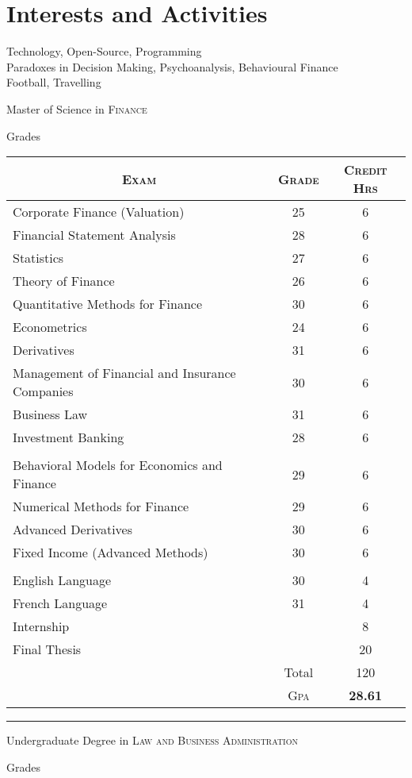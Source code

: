 \documentclass[a4paper,10pt]{article}
\begin{document}
	\section{Interests and Activities}
	Technology, Open-Source, Programming\\
	Paradoxes in Decision Making, Psychoanalysis, Behavioural Finance\\
	Football, Travelling
	
	\newpage
	\par{\centering\Large \hypertarget{grds}{Master of Science in \textsc{Finance}}\par}\large{\centering Grades\par}\normalsize
	\begin{center}
		\begin{tabular}{lcc}
			\multicolumn{1}{c}{\textsc{Exam}}&\textsc{Grade}&\textsc{Credit Hrs}\\ \hline
			Corporate Finance (Valuation)	&25&	6\\
			Financial Statement Analysis	&28&	6\\
			Statistics	&27&	6\\
			Theory of Finance	&26&	6\\
			Quantitative Methods for Finance	&30&	6\\
			Econometrics	&24	&6\\
			Derivatives	&31&	6\\
			Management of Financial and Insurance Companies	&30&	6\\
			Business Law	&31&	6\\
			Investment Banking	&28&	6\\ \\
			
			Behavioral Models for Economics and Finance	&29&	6\\
			Numerical Methods for Finance	&29&	6\\
			Advanced Derivatives	&30&	6\\
			Fixed Income (Advanced Methods)	&30&	6\\ \\
			
			English Language	&30&	4\\
			French Language	&31&	4\\
			
			Internship	&	&8\\
			
			Final Thesis	&	&20\\
			
			& Total&120\\\cline{2-3}
			&\textsc{Gpa}&\textbf{28.61}
		\end{tabular}
	\end{center}
	\bigskip
	\hrule
	\bigskip
	\par{\centering\Large \hypertarget{grds_cleli}{Undergraduate Degree in \textsc{Law and Business Administration}}\par}\large{\centering Grades\par}\normalsize
	
\end{document}
